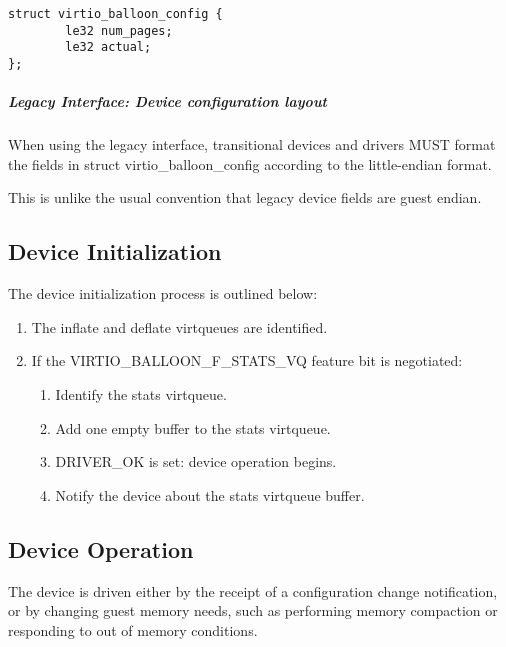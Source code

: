 \begin{lstlisting}
struct virtio_balloon_config {
        le32 num_pages;
        le32 actual;
};
\end{lstlisting}

\subparagraph{Legacy Interface: Device configuration layout}\label{sec:Device Types / Memory Balloon Device / Device
configuration layout / Legacy Interface: Device configuration layout}
When using the legacy interface, transitional devices and drivers
MUST format the fields in struct virtio_balloon_config
according to the little-endian format.
\begin{note}
This is unlike the usual convention that legacy device fields are guest endian.
\end{note}

\subsection{Device Initialization}\label{sec:Device Types / Memory Balloon Device / Device Initialization}

The device initialization process is outlined below:

\begin{enumerate}
\item The inflate and deflate virtqueues are identified.

\item If the VIRTIO_BALLOON_F_STATS_VQ feature bit is negotiated:
  \begin{enumerate}
  \item Identify the stats virtqueue.
  \item Add one empty buffer to the stats virtqueue.
  \item DRIVER_OK is set: device operation begins.
  \item Notify the device about the stats virtqueue buffer.
  \end{enumerate}
\end{enumerate}

\subsection{Device Operation}\label{sec:Device Types / Memory Balloon Device / Device Operation}

The device is driven either by the receipt of a configuration
change notification, or by changing guest memory needs, such as
performing memory compaction or responding to out of memory
conditions.

